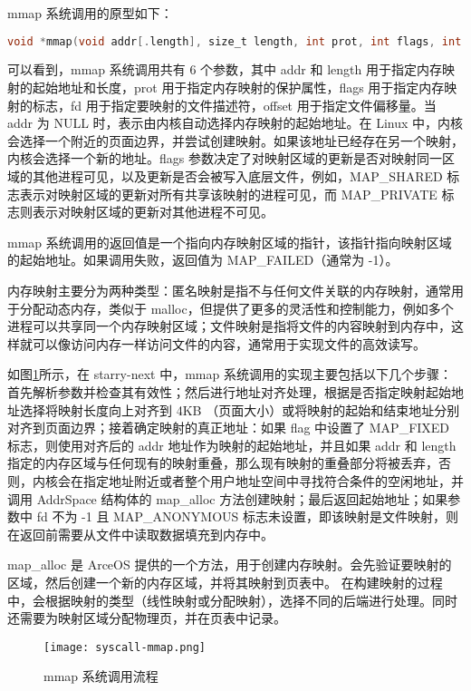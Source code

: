mmap 系统调用的原型如下：


\begin{lstlisting}[language=C, caption=mmap 系统调用函数原型]
void *mmap(void addr[.length], size_t length, int prot, int flags, int fd, off_t offset);
\end{lstlisting}



可以看到，mmap 系统调用共有 6 个参数，其中 addr 和 length 用于指定内存映射的起始地址和长度，prot 用于指定内存映射的保护属性，flags 用于指定内存映射的标志，fd 用于指定要映射的文件描述符，offset 用于指定文件偏移量。当 addr 为 NULL 时，表示由内核自动选择内存映射的起始地址。在 Linux 中，内核会选择一个附近的页面边界，并尝试创建映射。如果该地址已经存在另一个映射，内核会选择一个新的地址。flags 参数决定了对映射区域的更新是否对映射同一区域的其他进程可见，以及更新是否会被写入底层文件，例如，MAP\_SHARED 标志表示对映射区域的更新对所有共享该映射的进程可见，而 MAP\_PRIVATE 标志则表示对映射区域的更新对其他进程不可见。

mmap 系统调用的返回值是一个指向内存映射区域的指针，该指针指向映射区域的起始地址。如果调用失败，返回值为 MAP\_FAILED（通常为 -1）。

内存映射主要分为两种类型：匿名映射是指不与任何文件关联的内存映射，通常用于分配动态内存，类似于 malloc，但提供了更多的灵活性和控制能力，例如多个进程可以共享同一个内存映射区域；文件映射是指将文件的内容映射到内存中，这样就可以像访问内存一样访问文件的内容，通常用于实现文件的高效读写。

如图\ref{fig:mmap}所示，在 starry-next 中，mmap 系统调用的实现主要包括以下几个步骤：首先解析参数并检查其有效性；然后进行地址对齐处理，根据是否指定映射起始地址选择将映射长度向上对齐到 4KB （页面大小）或将映射的起始和结束地址分别对齐到页面边界；接着确定映射的真正地址：如果 flag 中设置了 MAP\_FIXED 标志，则使用对齐后的 addr 地址作为映射的起始地址，并且如果 addr 和 length 指定的内存区域与任何现有的映射重叠，那么现有映射的重叠部分将被丢弃，否则，内核会在指定地址附近或者整个用户地址空间中寻找符合条件的空闲地址，并调用 AddrSpace 结构体的 map\_alloc 方法创建映射；最后返回起始地址；如果参数中 fd 不为 -1 且 MAP\_ANONYMOUS 标志未设置，即该映射是文件映射，则在返回前需要从文件中读取数据填充到内存中。

map\_alloc 是 ArceOS 提供的一个方法，用于创建内存映射。会先验证要映射的区域，然后创建一个新的内存区域，并将其映射到页表中。
在构建映射的过程中，会根据映射的类型（线性映射或分配映射），选择不同的后端进行处理。同时还需要为映射区域分配物理页，并在页表中记录。

\begin{figure}[H]
    \centering
    \texttt{[image: syscall-mmap.png]}
    \caption{mmap 系统调用流程}
    \label{fig:mmap}
\end{figure}


